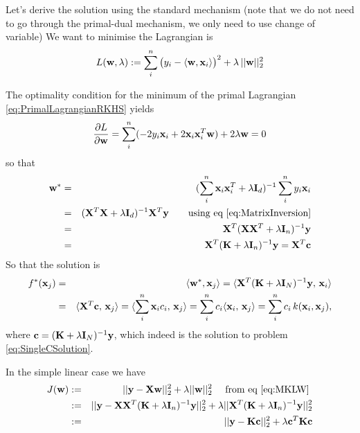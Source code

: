 Let's derive the solution using the standard mechanism (note that we do not need to go through the primal-dual mechanism, we only need to use change of variable)
We want to minimise the Lagrangian is
\begin{equation}\label{eq:PrimalLagrangianRKHS}
L(\mathbf{w},\lambda) := \sum_i^n \big( y_i - \langle \mathbf{w}, \mathbf{x}_i \rangle \big)^2 + \lambda \, ||\mathbf{w}||_2^2
\end{equation}

The optimality condition for the minimum of the primal Lagrangian \eqref{eq:PrimalLagrangianRKHS} yields
\begin{equation}
\frac{\partial L }{\partial \mathbf{w}} = \sum_i^n ( - 2 y_i \mathbf{x}_i + 2 \mathbf{x}_i \mathbf{x}^T_i \mathbf{w}) + 2 \lambda \mathbf{w} = 0
\end{equation} so that
\begin{eqnarray}\label{eq:MKLW}
\mathbf{w}^* & = & (\sum_i^n \mathbf{x}_i \mathbf{x}^T_i + \lambda \mathbf{I}_d)^{-1} \sum_i^n y_i \mathbf{x}_i \nonumber \\
& = & (\mathbf{X}^T \mathbf{X} + \lambda \mathbf{I}_d)^{-1} \mathbf{X}^T \mathbf{y} \qquad \text{using eq \eqref{eq:MatrixInversion}} \nonumber \\
& = & \mathbf{X}^T (\mathbf{X} \mathbf{X}^T + \lambda \mathbf{I}_n)^{-1} \mathbf{y} \nonumber \\
& = & \mathbf{X}^T (\mathbf{K} + \lambda \mathbf{I}_n)^{-1} \mathbf{y} = \mathbf{X}^T \mathbf{c}
\end{eqnarray}
So that the solution is
\begin{eqnarray}
f^*(\mathbf{x}_j) & = & \langle \mathbf{w}^*, \mathbf{x}_j \rangle
= \langle \mathbf{X}^T (\mathbf{K} + \lambda \mathbf{I}_N)^{-1} \mathbf{y}, \, \mathbf{x}_i \rangle \nonumber \\
& = & \langle \mathbf{X}^T \mathbf{c}, \, \mathbf{x}_j \rangle
= \langle \sum_i^n \mathbf{x}_i c_i, \, \mathbf{x}_j \rangle 
= \sum_i^n c_i \langle  \mathbf{x}_i , \, \mathbf{x}_j \rangle
= \sum_i^n c_i \, k(\mathbf{x}_i , \mathbf{x}_j ),
\end{eqnarray}
where $\mathbf{c} =  (\mathbf{K} + \lambda \mathbf{I}_N)^{-1} \mathbf{y}$, which indeed is the solution to problem \eqref{eq:SingleCSolution}.

In the simple linear case we have
\begin{eqnarray}
J(\mathbf{w}) & := & ||\mathbf{y} - \mathbf{X}\mathbf{w}||_2^2 + \lambda ||\mathbf{w}||_2^2 \quad \text{ from eq \eqref{eq:MKLW} } \nonumber \\
& := & ||\mathbf{y} - \mathbf{X} \mathbf{X}^T (\mathbf{K} + \lambda \mathbf{I}_n)^{-1} \mathbf{y} ||_2^2 + \lambda ||\mathbf{X}^T (\mathbf{K} + \lambda \mathbf{I}_n)^{-1} \mathbf{y} ||_2^2 \nonumber \\
& := & ||\mathbf{y} - \mathbf{K} \mathbf{c}||_2^2 + \lambda \mathbf{c}^T \mathbf{K} \mathbf{c}
\end{eqnarray}

